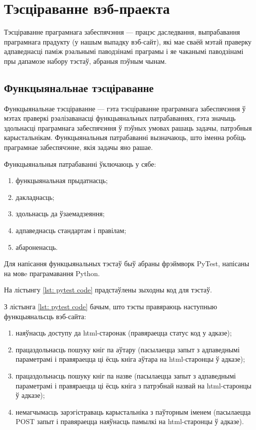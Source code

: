 \section{Тэсціраванне вэб-праекта}

Тэсціраванне праграмнага забеспячэння --- працэс даследвання, выпрабавання праграмнага прадукту
(у нашым выпадку вэб-сайт), які мае сваёй мэтай праверку адпаведнасці паміж рэальнымі паводзінамі праграмы
і яе чаканымі паводзінамі пры дапамозе набору тэстаў, абраныя пэўным чынам.

\subsection{Функцыянальнае тэсціраванне}

Функцыянальнае тэсціраванне --- гэта тэсціраванне праграмнага забеспячэння ў мэтах праверкі
рэалізаванасці функцыянальных патрабаваннях, гэта значыць здольнасці праграмнага забеспячэння
ў пэўных умовах рашаць задачы, патрэбныя карыстальнікам. Функцыянальныя патрабаванні вызначаюць,
што іменна робіць праграмнае забеспячэнне, якія задачы яно рашае.

Функцыянальныя патрабаванні ўключаюць у сябе:
\begin{enumerate}
    \item функцыянальная прыдатнасць;
    \item дакладнасць;
    \item здольнасць да ўзаемадзеяння;
    \item адпаведнасць стандартам і правілам;
    \item абароненасць.
\end{enumerate}

Для напісання функцыянальных тэстаў быў абраны фрэймворк PyTest, напісаны на
мовe праграмавання Python.

На лістынгу \ref{lst: pytest code} прадстаўлены зыходны код для тэстаў.
 


З лістынга \ref{lst: pytest code} бачым, што тэсты правяраюць наступныю функцыянальсць вэб-сайта:
\begin{enumerate}
    \item наяўнасць доступу да html-старонак (правяраецца статус код у адказе);
    \item працаздольнасць пошуку кніг па аўтару (пасылаецца запыт з адпаведнымі параметрамі і
          правяраецца ці ёсць кніга аўтара на html-старонцы ў адказе);
    \item працаздольнасць пошуку кніг па назве (пасылаецца запыт з адпаведнымі параметрамі і
          правяраецца ці ёсць кніга з патрэбнай назвай на html-старонцы ў адказе);
    \item немагчымасць зарэгістраваць карыстальніка з паўторным іменем (пасылаецца POST запыт і
          правяраецца наяўнасць памылкі на html-старонцы ў адказе).
\end{enumerate}

